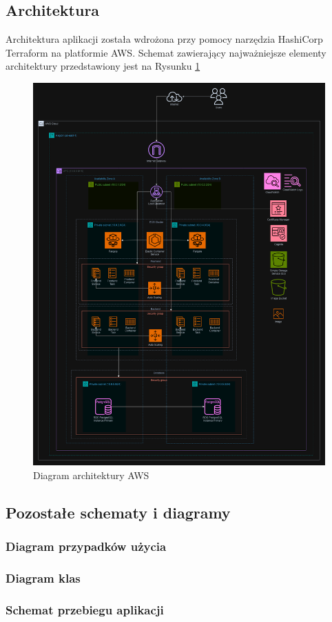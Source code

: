 \documentclass[../main.tex]{subfiles}
\begin{document}
    \subsection{Architektura}
        Architektura aplikacji została wdrożona przy pomocy narzędzia HashiCorp Terraform na platformie AWS. Schemat zawierający najważniejsze elementy architektury przedstawiony jest na Rysunku \ref{fig:aws-architecture} 
        \begin{figure}[!ht]
            \centering
            \includegraphics[width=1.0\linewidth]{images/AWS-diagram.png}
            \caption{Diagram architektury AWS}
            \label{fig:aws-architecture}
        \end{figure}

    \subsection{Pozostałe schematy i diagramy}

        \subsubsection*{Diagram przypadków użycia}
        \subsubsection*{Diagram klas}
        \subsubsection*{Schemat przebiegu aplikacji}
\end{document}
